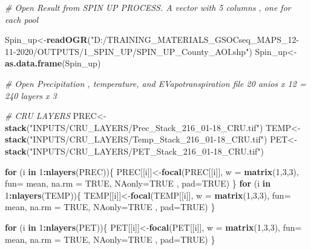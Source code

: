 \documentclass[
  10pt,
  b5paper,
]{book}
\newenvironment{Shaded}{\begin{snugshade}}{\end{snugshade}}
\newcommand{\CommentTok}[1]{\textcolor[rgb]{0.56,0.35,0.01}{\textit{#1}}}
\newcommand{\ControlFlowTok}[1]{\textcolor[rgb]{0.13,0.29,0.53}{\textbf{#1}}}
\newcommand{\DataTypeTok}[1]{\textcolor[rgb]{0.13,0.29,0.53}{#1}}
\newcommand{\DecValTok}[1]{\textcolor[rgb]{0.00,0.00,0.81}{#1}}
\newcommand{\KeywordTok}[1]{\textcolor[rgb]{0.13,0.29,0.53}{\textbf{#1}}}
\newcommand{\NormalTok}[1]{#1}
\newcommand{\OperatorTok}[1]{\textcolor[rgb]{0.81,0.36,0.00}{\textbf{#1}}}
\newcommand{\OtherTok}[1]{\textcolor[rgb]{0.56,0.35,0.01}{#1}}
\newcommand{\StringTok}[1]{\textcolor[rgb]{0.31,0.60,0.02}{#1}}
\begin{document}
\begin{Shaded}
\begin{Highlighting}[]
\CommentTok{# Open Result from SPIN UP PROCESS. A vector with 5 columns , one for each pool}

\NormalTok{Spin_up<-}\KeywordTok{readOGR}\NormalTok{(}\StringTok{"D:/TRAINING_MATERIALS_GSOCseq_MAPS_12-11-2020/OUTPUTS/1_SPIN_UP/SPIN_UP_County_AOI.shp"}\NormalTok{)}
\NormalTok{Spin_up<-}\KeywordTok{as.data.frame}\NormalTok{(Spin_up)}

\CommentTok{# Open Precipitation , temperature, and EVapotranspiration file 20 anios x 12 = 240 layers x 3}

\CommentTok{# CRU LAYERS}
\NormalTok{PREC<-}\KeywordTok{stack}\NormalTok{(}\StringTok{"INPUTS/CRU_LAYERS/Prec_Stack_216_01-18_CRU.tif"}\NormalTok{)}
\NormalTok{TEMP<-}\KeywordTok{stack}\NormalTok{(}\StringTok{"INPUTS/CRU_LAYERS/Temp_Stack_216_01-18_CRU.tif"}\NormalTok{)}
\NormalTok{PET<-}\KeywordTok{stack}\NormalTok{(}\StringTok{"INPUTS/CRU_LAYERS/PET_Stack_216_01-18_CRU.tif"}\NormalTok{)}

\ControlFlowTok{for}\NormalTok{ (i }\ControlFlowTok{in} \DecValTok{1}\OperatorTok{:}\KeywordTok{nlayers}\NormalTok{(PREC))\{}
\NormalTok{  PREC[[i]]<-}\KeywordTok{focal}\NormalTok{(PREC[[i]], }\DataTypeTok{w =} \KeywordTok{matrix}\NormalTok{(}\DecValTok{1}\NormalTok{,}\DecValTok{3}\NormalTok{,}\DecValTok{3}\NormalTok{), }\DataTypeTok{fun=}\NormalTok{ mean,  }\DataTypeTok{na.rm =} \OtherTok{TRUE}\NormalTok{, }\DataTypeTok{NAonly=}\OtherTok{TRUE}\NormalTok{ , }\DataTypeTok{pad=}\OtherTok{TRUE}\NormalTok{)}
\NormalTok{\}}
\ControlFlowTok{for}\NormalTok{ (i }\ControlFlowTok{in} \DecValTok{1}\OperatorTok{:}\KeywordTok{nlayers}\NormalTok{(TEMP))\{}
\NormalTok{  TEMP[[i]]<-}\KeywordTok{focal}\NormalTok{(TEMP[[i]], }\DataTypeTok{w =} \KeywordTok{matrix}\NormalTok{(}\DecValTok{1}\NormalTok{,}\DecValTok{3}\NormalTok{,}\DecValTok{3}\NormalTok{), }\DataTypeTok{fun=}\NormalTok{ mean,  }\DataTypeTok{na.rm =} \OtherTok{TRUE}\NormalTok{, }\DataTypeTok{NAonly=}\OtherTok{TRUE}\NormalTok{ , }\DataTypeTok{pad=}\OtherTok{TRUE}\NormalTok{)}
\NormalTok{\}}

\ControlFlowTok{for}\NormalTok{ (i }\ControlFlowTok{in} \DecValTok{1}\OperatorTok{:}\KeywordTok{nlayers}\NormalTok{(PET))\{}
\NormalTok{  PET[[i]]<-}\KeywordTok{focal}\NormalTok{(PET[[i]], }\DataTypeTok{w =} \KeywordTok{matrix}\NormalTok{(}\DecValTok{1}\NormalTok{,}\DecValTok{3}\NormalTok{,}\DecValTok{3}\NormalTok{), }\DataTypeTok{fun=}\NormalTok{ mean,  }\DataTypeTok{na.rm =} \OtherTok{TRUE}\NormalTok{, }\DataTypeTok{NAonly=}\OtherTok{TRUE}\NormalTok{ , }\DataTypeTok{pad=}\OtherTok{TRUE}\NormalTok{)}
\NormalTok{\}}



\end{Highlighting}
\end{Shaded}
\end{document}
